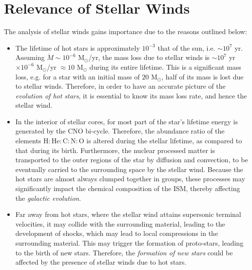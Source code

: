 	\section{Relevance of Stellar Winds} \label{tool:relevance}
		The analysis of stellar winds gains importance due to the reasons outlined below:
		\begin{itemize}
			\item The lifetime of hot stars is approximately $10^{-3}$ that of the sun, i.e. $\sim 10^7$ yr. Assuming $\dot{M}\sim 10^{-6}$ M$_\odot$/yr, the mass loss due to stellar winds is $\sim 10^7$ yr $\times 10^{-6}$ M$_\odot$/yr $\approx 10$ M$_\odot$ during its entire lifetime. This is a significant mass loss, e.g. for a star with an initial mass of $20$ M$_\odot$, half of its mass is lost due to stellar winds. Therefore, in order to have an accurate picture of the \emph{evolution of hot stars}, it is essential to know its mass loss rate, and hence the stellar wind.
			\item In the interior of stellar cores, for most part of the star's lifetime energy is generated by the CNO bi-cycle. Therefore, the abundance ratio of the elements $\text{H}:\text{He}:\text{C}:\text{N}:\text{O}$ is altered during the stellar lifetime, as compared to that during its birth. Furthermore, the nuclear processed matter is transported to the outer regions of the star by diffusion and convection, to be eventually carried to the surrounding space by the stellar wind. Because the hot stars are almost always clumped together in groups, these processes may significantly impact the chemical composition of the ISM, thereby affecting the \emph{galactic evolution}.
			\item Far away from hot stars, where the stellar wind attains supersonic terminal velocities, it may collide with the surrounding material, leading to the development of shocks, which may lead to local compressions in the surrounding material. This may trigger the formation of proto-stars, leading to the birth of new stars. Therefore, the \emph{formation of new stars} could be affected by the presence of stellar winds due to hot stars.
		\end{itemize}
	
